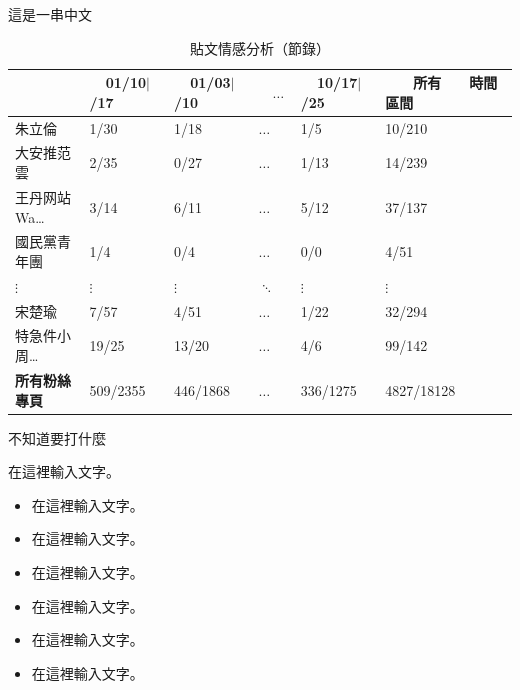 \documentclass[final,hyperref={pdfpagelabels=false}]{beamer}
\begin{document}
\begin{CJK}{UTF8}{bsmi}
\begin{frame}
\begin{minipage}{0.59\textwidth}
\begin{block}{這是一串中文}

  \begin{table}[!htbp]
  \caption{貼文情感分析（節錄）}
  \label{t5}
  \begin{tabular}{@{}L{8.5cm}R{4.5cm}R{4.5cm}R{1.7cm}R{4.5cm}R{5.7cm}@{}}
  \toprule
  　\newline　 & %
  　\,01/10\newline\hspace*{1.25em}$\vert$/17 & %
  　\,01/03\newline\hspace*{1.25em}$\vert$/10 & %
  　\newline$\ldots$\newline　 & %
  　\,10/17\newline\hspace*{1.25em}$\vert$/25 & %
  　{\bfseries 　所有　　時間　　區間} \\
  \midrule
  朱立倫 & 1/30 & 1/18 & $\ldots$ & 1/5 & 10/210 \\
  大安推范雲 & 2/35 & 0/27 & $\ldots$ & 1/13 & 14/239 \\
  王丹网站 Wa\dots & 3/14 & 6/11 & $\ldots$ & 5/12 & 37/137 \\
  國民黨青年團 & 1/4 & 0/4 & $\ldots$ & 0/0 & 4/51 \\
  $\vdots$ & $\vdots$ & $\vdots$ & $\ddots$ & $\vdots$ & $\vdots$ \\
  宋楚瑜 & 7/57 & 4/51 & $\ldots$ & 1/22 & 32/294 \\
  特急件小周\dots & 19/25 & 13/20 & $\ldots$ & 4/6 & 99/142 \\
  {\bfseries 所有粉絲專頁} & 509/2355 & 446/1868 & $\ldots$ & 336/1275 & 4827/18128 \\
  \bottomrule
  \end{tabular}
  \end{table}

\end{block}
\end{minipage}
\quad
\begin{minipage}{0.39\textwidth}
\begin{block}{不知道要打什麼}
  \begin{center}
    在這裡輸入文字。
    \vspace*{8mm}
  \end{center}
  \begin{itemize}
    \item 在這裡輸入文字。
    \item 在這裡輸入文字。
    \item 在這裡輸入文字。
    \item 在這裡輸入文字。
    \item 在這裡輸入文字。
    \item 在這裡輸入文字。
  \end{itemize}
\end{block}
\end{minipage}


\end{frame}
\end{CJK}
\end{document}
